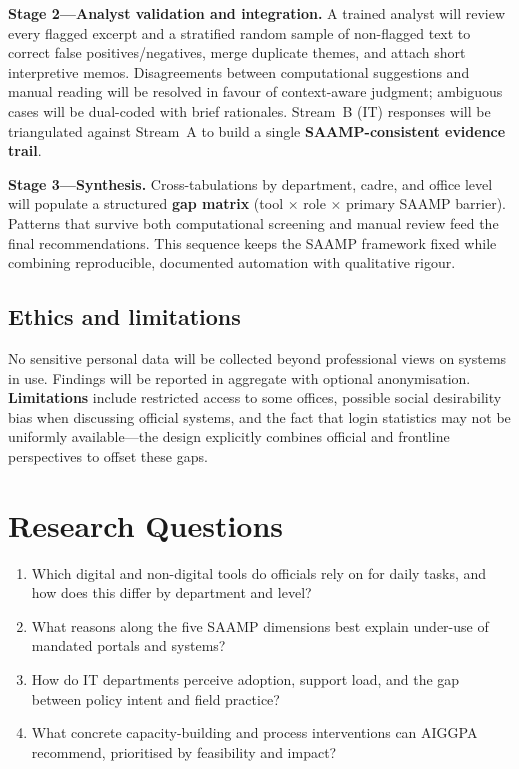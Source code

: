 \documentclass[11pt,a4paper]{article}
\begin{document}
\textbf{Stage 2---Analyst validation and integration.} A trained analyst will review every flagged excerpt and a stratified random sample of non-flagged text to correct false positives/negatives, merge duplicate themes, and attach short interpretive memos. Disagreements between computational suggestions and manual reading will be resolved in favour of context-aware judgment; ambiguous cases will be dual-coded with brief rationales. Stream~B (IT) responses will be triangulated against Stream~A to build a single \textbf{SAAMP-consistent evidence trail}.

\textbf{Stage 3---Synthesis.} Cross-tabulations by department, cadre, and office level will populate a structured \textbf{gap matrix} (tool $\times$ role $\times$ primary SAAMP barrier). Patterns that survive both computational screening and manual review feed the final recommendations. This sequence keeps the SAAMP framework fixed while combining reproducible, documented automation with qualitative rigour.

\subsection{Ethics and limitations}

No sensitive personal data will be collected beyond professional views on systems in use. Findings will be reported in aggregate with optional anonymisation. \textbf{Limitations} include restricted access to some offices, possible social desirability bias when discussing official systems, and the fact that login statistics may not be uniformly available---the design explicitly combines official and frontline perspectives to offset these gaps.

\vspace{0.35cm}

\section{Research Questions}

\vspace{0.2cm}
\begin{navybox}
\small
\begin{enumerate}[label=\textbf{RQ\arabic*.}, itemsep=6pt, leftmargin=2em]
  \item Which digital and non-digital tools do officials rely on for daily tasks, and how does this differ by department and level?
  \item What reasons along the five SAAMP dimensions best explain under-use of mandated portals and systems?
  \item How do IT departments perceive adoption, support load, and the gap between policy intent and field practice?
  \item What concrete capacity-building and process interventions can AIGGPA recommend, prioritised by feasibility and impact?
\end{enumerate}
\end{navybox}
\end{document}
